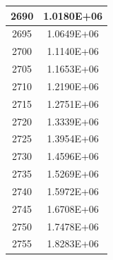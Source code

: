 \documentclass[a4paper]{article}
\begin{document}
\begin{tabular}{|c|c|}
		\hline
		2690 & 1.0180E+06 \\
		\hline
		2695 & 1.0649E+06 \\
		\hline
		2700 & 1.1140E+06 \\
		\hline
		2705 & 1.1653E+06 \\
		\hline
		2710 & 1.2190E+06 \\
		\hline
		2715 & 1.2751E+06 \\
		\hline
		2720 & 1.3339E+06 \\
		\hline
		2725 & 1.3954E+06 \\
		\hline
		2730 & 1.4596E+06 \\
		\hline
		2735 & 1.5269E+06 \\
		\hline
		2740 & 1.5972E+06 \\
		\hline
		2745 & 1.6708E+06 \\
		\hline
		2750 & 1.7478E+06 \\
		\hline
		2755 & 1.8283E+06 \\
		\hline
	\end{tabular}
	\hfill
\end{document}
